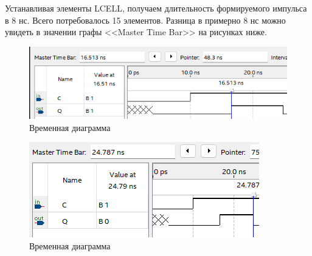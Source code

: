 \documentclass[a4paper,12pt]{article}
\begin{document}
    Устанавливая элементы LCELL, получаем длительность формируемого импульса в 8 нс. Всего потребовалось
    15 элементов. Разница в примерно 8 нс можно увидеть в значении графы <<Master Time Bar>> на рисунках
    ниже.

    \begin{minipage}{0.49\linewidth}
        \begin{figure}[H]
            \centering
            \includegraphics[width=\linewidth]{polytech/scheme/report-lab3/subfiles/images/wave-5-1}
            \caption{Временная диаграмма}
            \label{fig:wave-5-1}
        \end{figure}
    \end{minipage}
    \begin{minipage}{0.49\linewidth}
        \begin{figure}[H]
            \centering
            \includegraphics[width=\linewidth]{polytech/scheme/report-lab3/subfiles/images/wave-5-2}
            \caption{Временная диаграмма}
            \label{fig:wave-5-2}
        \end{figure}
    \end{minipage}
\end{document}
